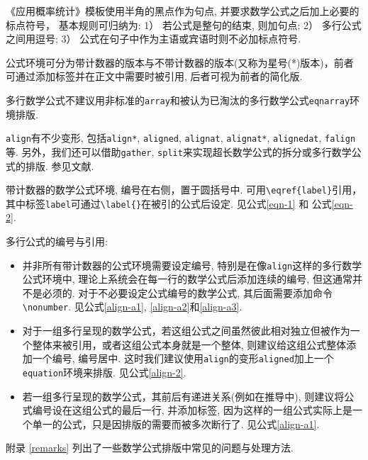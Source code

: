 \documentclass[Chinese]{APSart}
\begin{document}
\begin{remark}
《应用概率统计》模板使用半角的黑点作为句点, 并要求数学公式之后加上必要的标点符号， 基本规则可归纳为: 1） 若公式是整句的结束, 则加句点; 2） 多行公式之间用逗号; 3） 公式在句子中作为主语或宾语时则不必加标点符号. 
\end{remark}	
\begin{remark}
公式环境可分为带计数器的版本与不带计数器的版本(又称为星号(*)版本)，前者可通过添加标签并在正文中需要时被引用, 后者可视为前者的简化版. 
\end{remark}

\begin{remark}
多行数学公式不建议用非标准的\texttt{array}和被认为已淘汰的多行数学公式\texttt{eqnarray}环境排版.
\end{remark}

\begin{remark}
\texttt{align}有不少变形, 包括\texttt{align*}, \texttt{aligned},  \texttt{alignat}, \texttt{alignat*}, \texttt{alignedat}, \texttt{falign}等. 另外，我们还可以借助\texttt{gather}, \texttt{split}来实现超长数学公式的拆分或多行数学公式的排版. 参见文献.  
\end{remark}

\begin{remark}
	带计数器的数学公式环境, 编号在右侧，置于圆括号中. 可用\verb|\eqref{label}|引用，其中标签\texttt{label}可通过\verb=\label{}=在被引的公式后设定. 见公式\eqref{eqn-1} 和 公式\eqref{eqn-2}. 
\end{remark}

\begin{remark}
	多行公式的编号与引用:
	\begin{itemize}[leftmargin=7.8mm,itemsep=-0.1ex]
		\item 并非所有带计数器的公式环境需要设定编号, 特别是在像\texttt{align}这样的多行数学公式环境中, 理论上系统会在每一行的数学公式后添加连续的编号, 但这通常并不是必须的. 对于不必要设定公式编号的数学公式, 其后面需要添加命令\verb/\nonumber/. 见公式\eqref{align-a1}, \eqref{align-a2}和\eqref{align-a3}.
		\item 
		对于一组多行呈现的数学公式，若这组公式之间虽然彼此相对独立但被作为一个整体来被引用，或者这组公式本身就是一个整体, 则建议给这组公式整体添加一个编号, 编号居中. 这时我们建议使用\texttt{align}的变形\texttt{aligned}加上一个\texttt{equation}环境来排版. 见公式\eqref{align-2}. 	
		\item 
		若一组多行呈现的数学公式，其前后有递进关系(例如在推导中), 则建议将公式编号设在这组公式的最后一行, 并添加标签, 因为这样的一组公式实际上是一个单一的公式，只是因排版的需要而被多次断行了. 见公式\eqref{align-a1}.	
	\end{itemize}
\end{remark}
附录 \ref{remarks} 列出了一些数学公式排版中常见的问题与处理方法. 
\end{document}
